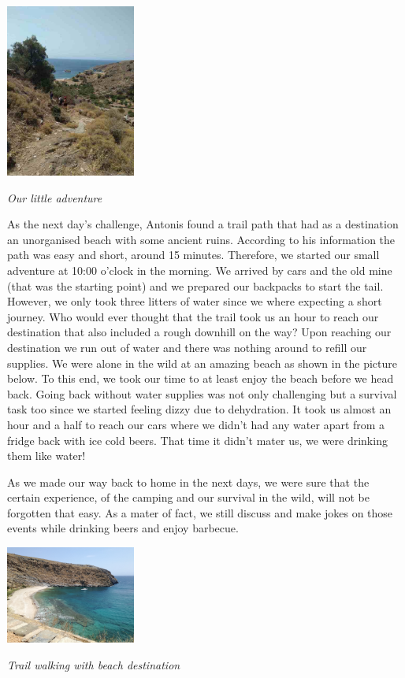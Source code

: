\documentclass[10pt,a4paper]{article} %
\begin{document}
\begin{multicols}{3}
\begin{center}
	\includegraphics[width=0.32\textwidth]{media/way_to_beach.jpg}
	\par\textit{Our little adventure}
\end{center}

As the next day's challenge, Antonis found a trail path that had as a destination 
an unorganised beach with some ancient ruins. 
According to his information the path was easy and short, around 15 minutes. 
Therefore, we started our small adventure at 10:00 o'clock in the morning. 
We arrived by cars and the old mine (that was the starting point) and we prepared 
our backpacks to start the tail. 
However, we only took three litters of water since we where expecting a short 
journey. 
Who would ever thought that the trail took us an hour to reach our destination 
that also included a rough downhill on the way?
Upon reaching our destination we run out of water and there was nothing around 
to refill our supplies. 
We were alone in the wild at an amazing beach as shown in the picture below. 
To this end, we took our time to at least enjoy the beach before we head back. 
Going back without water supplies was not only challenging but a survival task too 
since we started feeling dizzy due to dehydration.   
It took us almost an hour and a half to reach our cars where we didn't had any water 
apart from a fridge back with ice cold beers. 
That time it didn't mater us, we were  drinking them like water! 


As we made our way back to home in the next days, we were sure that the 
certain experience, of the camping and our survival in the wild, will not be 
forgotten that easy. 
As a mater of fact, we still discuss and make jokes on those events while 
drinking beers and enjoy barbecue.   


\begin{center}
	\includegraphics[width=0.32\textwidth]{media/isolated_beach.jpg}
	\par\textit{Trail walking with beach destination}
\end{center}



\end{multicols}
\end{document}
